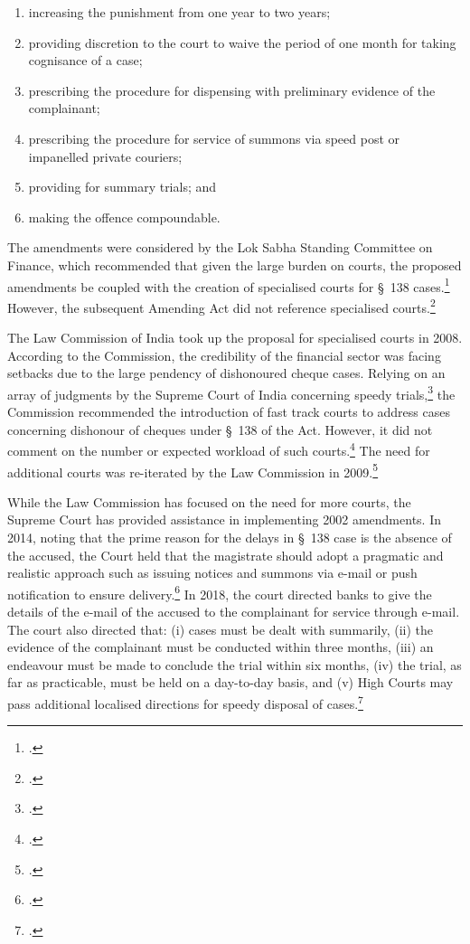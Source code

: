 \begin{enumerate}[label=(\alph*)]
 \item increasing the punishment from one year to two years;
 \item providing discretion to the court to waive the period of one month for taking cognisance of a case;
 \item prescribing the procedure for dispensing with preliminary evidence of the complainant;
 \item prescribing the procedure for service of summons via speed post or impanelled private couriers;
 \item providing for summary trials; and
 \item making the offence compoundable.
\end{enumerate}

The amendments were considered by the Lok Sabha Standing Committee on Finance, which recommended that given the large burden on courts, the proposed amendments be coupled with the creation of specialised courts for \S~138 cases.\footcite{stdcomm2001_138niAct} However, the subsequent Amending Act did not reference specialised courts.\footcite{niAmend2002}

The Law Commission of India took up the proposal for specialised courts in 2008. According to the Commission, the credibility of the financial sector was facing setbacks due to the large pendency of dishonoured cheque cases. Relying on an array of judgments by the Supreme Court of India concerning speedy trials,\footcite{sc1978_khatoon, sc1981_champalal, sc2005_surinder, sc2008_krishna} the Commission recommended the introduction of fast track courts to address cases concerning dishonour of cheques under \S~138 of the Act. However, it did not comment on the number or expected workload of such courts.\footcite{lci2008_138} The need for additional courts was re-iterated by the Law Commission in 2009.\footcite{lci2009_reforms}

While the Law Commission has focused on the need for more courts, the Supreme Court has provided assistance in implementing 2002 amendments. In 2014, noting that the prime reason for the delays in \S~138 case is the absence of the accused, the Court held that the magistrate should adopt a pragmatic and realistic approach such as issuing notices and summons via e-mail or push notification to ensure delivery.\footcite{sc2014_iba} In 2018, the court directed banks to give the details of the e-mail of the accused to the complainant for service through e-mail. The court also directed that: (i) cases must be dealt with summarily, (ii) the evidence of the complainant must be conducted within three months, (iii) an endeavour must be made to conclude the trial within six months, (iv) the trial, as far as practicable, must be held on a day-to-day basis, and (v) High Courts may pass additional localised directions for speedy disposal of cases.\footcite{sc2018_meters}

